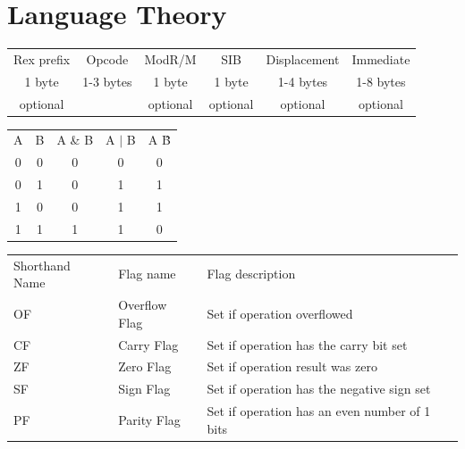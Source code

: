 \documentclass[a4paper,oneside,onecolumn,12pt]{LegrandOrangeBook}
\begin{document}
\chapter{Language Theory}
\begin{center}
    \begin{tabular}{|c|c|c|c|c|c|}
        Rex prefix & Opcode & ModR/M & SIB & Displacement & Immediate \\
        1 byte & 1-3 bytes & 1 byte & 1 byte & 1-4 bytes & 1-8 bytes \\
        optional &  & optional & optional & optional & optional
    \end{tabular}
\end{center}
\begin{center}
    \begin{tabular}{|c|c|c|c|c|}
        A & B & A \& B & A $|$ B & A \^ B \\
        0 & 0 & 0 & 0 & 0 \\
        0 & 1 & 0 & 1 & 1 \\
        1 & 0 & 0 & 1 & 1 \\
        1 & 1 & 1 & 1 & 0
    \end{tabular}
\end{center}
\begin{center}
    \begin{tabular}{|l|l|l|}
        Shorthand Name & Flag name & Flag description \\
        OF & Overflow Flag & Set if operation overflowed \\
        CF & Carry Flag & Set if operation has the carry bit set \\
        ZF & Zero Flag & Set if operation result was zero \\
        SF & Sign Flag & Set if operation has the negative sign set \\
        PF & Parity Flag & Set if operation has an even number of 1 bits \\
    \end{tabular}
\end{center}
\end{document}
